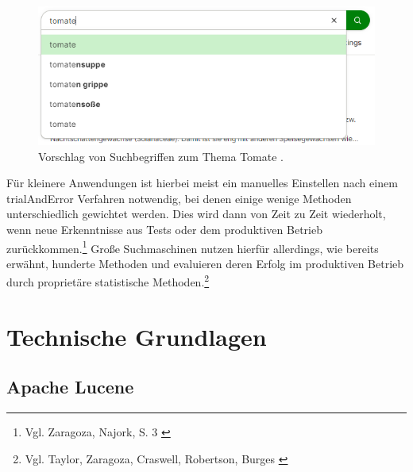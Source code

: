 \begin{figure}[h]
  \begin{centering}
    \includegraphics[width=\textwidth]{figures/foundations/tomatoSuggestion.png}
    \caption{Vorschlag von Suchbegriffen zum Thema Tomate \cite{ecosia2022}.}
    \label{fig:tomateVorschlag}
  \end{centering}
\end{figure}

Für kleinere Anwendungen ist hierbei meist ein manuelles Einstellen nach einem \gls{trialAndError} Verfahren notwendig, bei denen einige wenige Methoden unterschiedlich gewichtet werden.
Dies wird dann von Zeit zu Zeit wiederholt, wenn neue Erkenntnisse aus Tests oder dem produktiven Betrieb zurückkommen.\footnote{Vgl. Zaragoza, Najork, S. 3 \cite{zaragoza2018}}
Große Suchmaschinen nutzen hierfür allerdings, wie bereits erwähnt, hunderte Methoden und evaluieren deren Erfolg im produktiven Betrieb durch proprietäre statistische Methoden.\footnote{Vgl. Taylor, Zaragoza, Craswell, Robertson, Burges \cite{taylor2006}}

\chapter{Technische Grundlagen}
\label{ch:technischeGrundlagen}
\section{Apache Lucene}
\label{sec:lucene}

